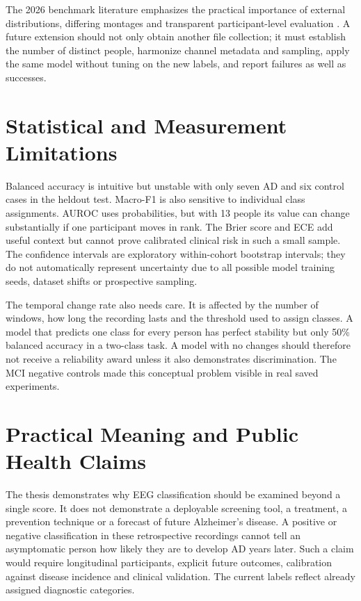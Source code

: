 The 2026 benchmark literature emphasizes the practical importance of external distributions, differing montages and transparent participant-level evaluation \cite{miltiadous2026benchmark,masry2026,xiong2026}. A future extension should not only obtain another file collection; it must establish the number of distinct people, harmonize channel metadata and sampling, apply the same model without tuning on the new labels, and report failures as well as successes.

\section{Statistical and Measurement Limitations}
Balanced accuracy is intuitive but unstable with only seven AD and six control cases in the heldout test. Macro-F1 is also sensitive to individual class assignments. AUROC uses probabilities, but with 13 people its value can change substantially if one participant moves in rank. The Brier score and ECE add useful context but cannot prove calibrated clinical risk in such a small sample. The confidence intervals are exploratory within-cohort bootstrap intervals; they do not automatically represent uncertainty due to all possible model training seeds, dataset shifts or prospective sampling.

The temporal change rate also needs care. It is affected by the number of windows, how long the recording lasts and the threshold used to assign classes. A model that predicts one class for every person has perfect stability but only 50\% balanced accuracy in a two-class task. A model with no changes should therefore not receive a reliability award unless it also demonstrates discrimination. The MCI negative controls made this conceptual problem visible in real saved experiments.

\section{Practical Meaning and Public Health Claims}
The thesis demonstrates why EEG classification should be examined beyond a single score. It does not demonstrate a deployable screening tool, a treatment, a prevention technique or a forecast of future Alzheimer's disease. A positive or negative classification in these retrospective recordings cannot tell an asymptomatic person how likely they are to develop AD years later. Such a claim would require longitudinal participants, explicit future outcomes, calibration against disease incidence and clinical validation. The current labels reflect already assigned diagnostic categories.

